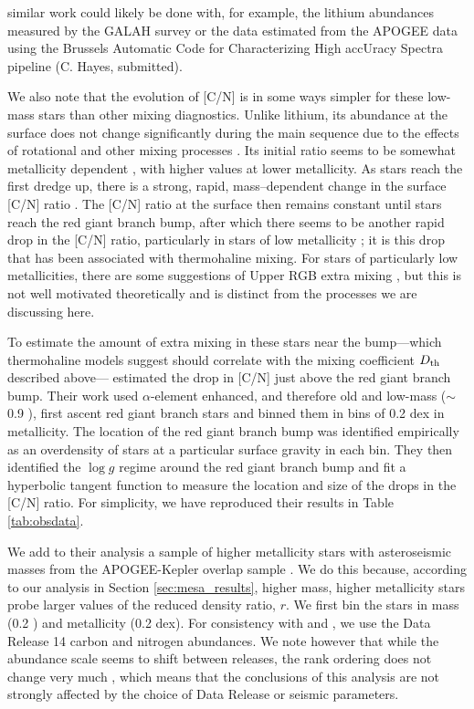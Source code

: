 similar work could likely be done with, for example, the lithium abundances measured by the GALAH survey \citep{buder2019} or the \ctwelvecthirteen data estimated from the APOGEE data using the Brussels Automatic Code for Characterizing High accUracy Spectra \citep[BACCHUS,][]{Masseron2016_BACCHUS} pipeline (C. Hayes, submitted). 

We also note that the evolution of [C/N] is in some ways simpler for these low-mass stars than other mixing diagnostics. Unlike lithium, its abundance at the surface does not change significantly during the main sequence due to the effects of rotational and other mixing processes \citep{Iben1967}. Its initial ratio seems to be somewhat metallicity dependent \citep{Shetrone2019}, with higher values at lower metallicity. As stars reach the first dredge up, there is a strong, rapid, mass--dependent change in the surface [C/N] ratio \citep{MasseronGilmore2015, Martig2016, Ness2016, Spoo2022}. The [C/N] ratio at the surface then remains constant until stars reach the red giant branch bump, after which there seems to be another rapid drop in the [C/N] ratio, particularly in stars of low metallicity \citep[e.g.][]{Gratton2000,Shetrone2019}; it is this drop that has been associated with thermohaline mixing.  For stars of particularly low metallicities, there are some suggestions of Upper RGB extra mixing \citep{Shetrone2019}, but this is not well motivated theoretically and is distinct from the processes we are discussing here.

To estimate the amount of extra mixing in these stars near the bump---which thermohaline models suggest should correlate with the mixing coefficient $D_\mathrm{th}$ described above---\citet{Shetrone2019} estimated the drop in [C/N] just above the red giant branch bump. Their work used $\alpha$-element enhanced, and therefore old and low-mass ($\sim$0.9 \msun), first ascent red giant branch stars and binned them in bins of 0.2 dex in metallicity. The location of the red giant branch bump was identified empirically as an overdensity of stars at a particular surface gravity in each bin. They then identified the $\log g$ regime around the red giant branch bump and fit a hyperbolic tangent function to measure the location and size of the drops in the [C/N] ratio. For simplicity, we have reproduced their results in Table \ref{tab:obsdata}. 

We add to their analysis a sample of higher metallicity stars with asteroseismic masses from the APOGEE-Kepler overlap sample \citep[APOKASC,][]{Pinsonneault2014, Pinsonneault2018}. We do this because, according to our analysis in Section \ref{sec:mesa_results}, higher mass, higher metallicity stars probe larger values of the reduced density ratio, $r$. %
We first bin the stars in mass (0.2 \msun) and  metallicity (0.2 dex). For consistency with \citet{Pinsonneault2018} and \citet{Shetrone2019}, we use the Data Release 14 \citet{DR14} carbon and nitrogen abundances. We note however that while the abundance scale seems to shift between releases, the rank ordering does not change very much \citep{Spoo2022}, which means that the conclusions of this analysis are not strongly affected by the choice of Data Release or seismic parameters.

